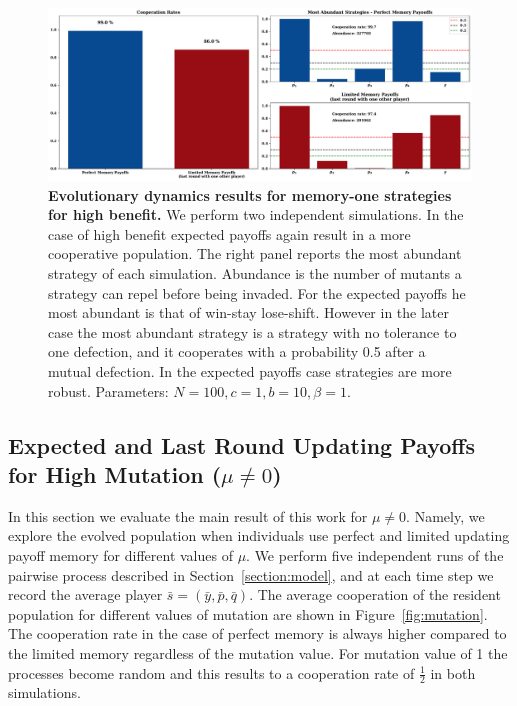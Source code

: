 \documentclass[11pt]{article}
\theoremstyle{plainCl1}
\theoremstyle{plainCl2}
\begin{document}
\begin{figure}[!htbp]
  \centering 
  \includegraphics[width=\textwidth]{static/memory_one_results_high_benefit.pdf}
  \caption{\textbf{Evolutionary dynamics results for memory-one strategies for high benefit.}
  We perform two independent simulations. In the case of high benefit expected
  payoffs again result in a more cooperative population. The right panel reports
  the most abundant strategy of each simulation. Abundance is the number of
  mutants a strategy can repel before being invaded. For the expected payoffs he
  most abundant is that of win-stay lose-shift. However in the later case the
  most abundant strategy is a strategy with no tolerance to one defection, and
  it cooperates with a probability 0.5 after a mutual defection.  In the expected
  payoffs case strategies are more robust.  Parameters: \(N =100, c=1, b=10,
  \beta=1\).}\label{fig:memory_one_high_benefit}
\end{figure}


\subsection{Expected and Last Round Updating Payoffs for High Mutation ($\mu \neq 0$)}\label{section:mutation}

In this section we evaluate the main result of this work for \(\mu \neq 0\).
Namely, we explore the evolved population when individuals use perfect and
limited updating payoff memory for different values of \(\mu\). We perform five
independent runs of the pairwise process described in
Section~\ref{section:model}, and at each time step we record the
average player \(\bar{s}=(\bar{y}, \bar{p}, \bar{q})\). The average cooperation
of the resident population for different values of mutation are shown in
Figure~\ref{fig:mutation}. The cooperation rate in the case of perfect
memory is always higher compared to the limited memory regardless of the
mutation value. For mutation value of 1 the processes become random and
this results to a cooperation rate of \(\frac{1}{2}\) in both simulations.
\end{document}

